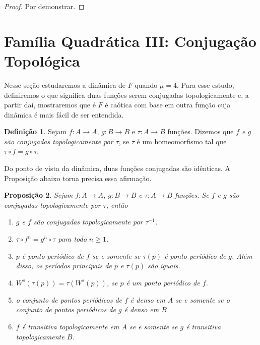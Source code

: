 \documentclass[a4paper, 12pt]{article}
\theoremstyle{definition}
\newtheorem{definition}{Definição}[section]
\theoremstyle{plain}
\newtheorem{proposition}[definition]{Proposição}
\theoremstyle{plain}
\theoremstyle{plain}
\theoremstyle{remark}
\begin{document}
\begin{proof}
Por demonstrar.
\end{proof}

\section{Família Quadrática III: Conjugação Topológica}

Nesse seção estudaremos a dinâmica de $F$ quando $\mu = 4$. Para esse estudo, definiremos o que significa duas funções serem conjugadas topologicamente e, a partir daí, mostraremos que é $F$ é caótica com base em outra função cuja dinâmica é mais fácil de ser entendida.

\begin{definition}
Sejam $f: A \rightarrow A$, $g: B \rightarrow B$ e $\tau: A \rightarrow B$ funções. Dizemos que \textit{$f$ e $g$ são conjugadas topologicamente por $\tau$}, se $\tau$ é um homeomorfismo tal que $\tau \circ f = g \circ \tau$.
\end{definition}

Do ponto de vista da dinâmica, duas funções conjugadas são idênticas. A Proposição abaixo torna precisa essa afirmação.

\begin{proposition}
\label{proposition 5 1}
Sejam $f: A \rightarrow A$, $g: B \rightarrow B$ e $\tau: A \rightarrow B$ funções. Se $f$ e $g$ são conjugadas topologicamente por $\tau$, então
\begin{enumerate}
\item $g$ e $f$ são conjugadas topologicamente por $\tau^{-1}$.
\item $\tau \circ f^n = g^n \circ \tau$ para todo $n \geq 1$.
\item $p$ é ponto periódico de $f$ se e somente se $\tau(p)$ é ponto periódico de $g$. Além disso, os períodos principais de $p$ e $\tau(p)$ são iguais.
\item $W^s(\tau(p)) = \tau(W^s(p))$, se $p$ é um ponto periódico de $f$.
\item o conjunto de pontos periódicos de $f$ é denso em $A$ se e somente se o conjunto de pontos periódicos de $g$ é denso em $B$.
\item $f$ é transitiva topologicamente em $A$ se e somente se $g$ é transitiva topologicamente $B$.
\end{enumerate}
\end{proposition}
\end{document}
